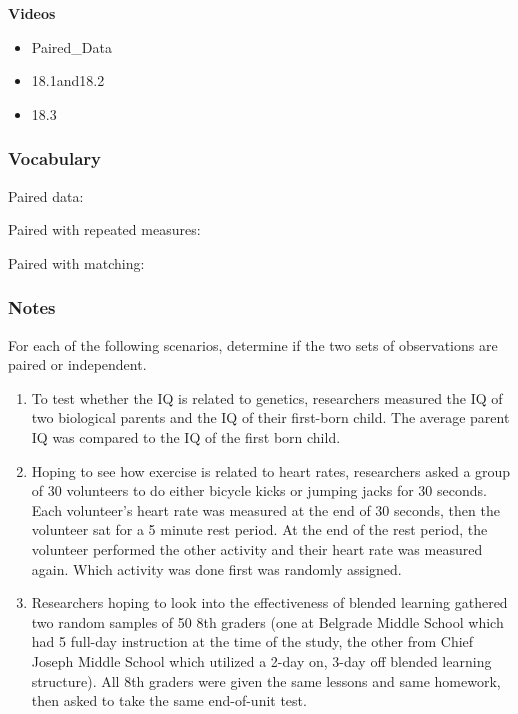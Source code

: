 \documentclass[
]{report}
\providecommand{\tightlist}{%
  \setlength{\itemsep}{0pt}\setlength{\parskip}{0pt}}
\newcommand{\rgs}{\vspace{12pt}} %
\newcommand{\rgi}{\hspace{24pt}}  %
\begin{document}

\textbf{Videos}

\begin{itemize}
\tightlist
\item
  Paired\_Data
\item
  18.1and18.2
\item
  18.3
\end{itemize}


\hypertarget{vocabulary-3}{%
\subsubsection*{Vocabulary}\label{vocabulary-3}}

Paired data:
\rgs

\rgi Paired with repeated measures:
\rgs

\rgi Paired with matching:
\rgs

\hypertarget{notes-3}{%
\subsubsection*{Notes}\label{notes-3}}

For each of the following scenarios, determine if the two sets of observations are paired or independent.

\begin{enumerate}
\def\labelenumi{\arabic{enumi}.}
\item
  To test whether the IQ is related to genetics, researchers measured the IQ of two biological parents and the IQ of their first-born child. The average parent IQ was compared to the IQ of the first born child.
  \rgs
\item
  Hoping to see how exercise is related to heart rates, researchers asked a group of 30 volunteers to do either bicycle kicks or jumping jacks for 30 seconds. Each volunteer's heart rate was measured at the end of 30 seconds, then the volunteer sat for a 5 minute rest period. At the end of the rest period, the volunteer performed the other activity and their heart rate was measured again. Which activity was done first was randomly assigned.
  \rgs
\item
  Researchers hoping to look into the effectiveness of blended learning gathered two random samples of 50 8th graders (one at Belgrade Middle School which had 5 full-day instruction at the time of the study, the other from Chief Joseph Middle School which utilized a 2-day on, 3-day off blended learning structure). All 8th graders were given the same lessons and same homework, then asked to take the same end-of-unit test.
  \rgs
\end{enumerate}
\end{document}
